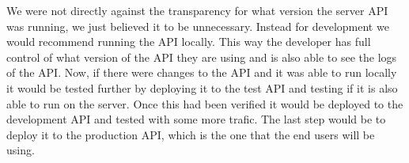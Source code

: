 We were not directly against the transparency for what version the server API was running, we just believed it to be unnecessary.
Instead for development we would recommend running the API locally.
This way the developer has full control of what version of the API they are using and is also able to see the logs of the API.
Now, if there were changes to the API and it was able to run locally it would be tested further by deploying it to the test API and testing if it is also able to run on the server.
Once this had been verified it would be deployed to the development API and tested with some more trafic.
The last step would be to deploy it to the production API, which is the one that the end users will be using.
